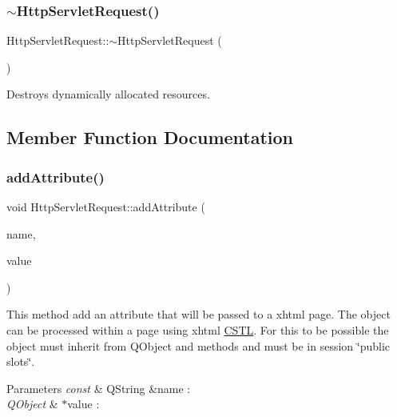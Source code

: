 \subsubsection{\texorpdfstring{$\sim$\+Http\+Servlet\+Request()}{~HttpServletRequest()}}
{\footnotesize\ttfamily Http\+Servlet\+Request\+::$\sim$\+Http\+Servlet\+Request (\begin{DoxyParamCaption}{ }\end{DoxyParamCaption})\hspace{0.3cm}{\ttfamily [virtual]}}



Destroys dynamically allocated resources. 



\subsection{Member Function Documentation}
\mbox{\label{class_http_servlet_request_a2537c9716161ea25d83e2aea5b26a945}} 
\subsubsection{\texorpdfstring{add\+Attribute()}{addAttribute()}}
{\footnotesize\ttfamily void Http\+Servlet\+Request\+::add\+Attribute (\begin{DoxyParamCaption}\item[{const Q\+String \&}]{name,  }\item[{Q\+Object $\ast$}]{value }\end{DoxyParamCaption})}



This method add an attribute that will be passed to a xhtml page. The object can be processed within a page using xhtml \hyperlink{namespace_c_s_t_l}{C\+S\+TL}. For this to be possible the object must inherit from Q\+Object and methods and must be in session \char`\"{}public slots\char`\"{}. 


\begin{DoxyParams}{Parameters}
{\em const} & Q\+String \&name \+: \\
\hline
{\em Q\+Object} & $\ast$value \+: \\
\hline
\end{DoxyParams}
\mbox{\label{class_http_servlet_request_a5bcadf4489d18ae04399c2340da4726a}} 
